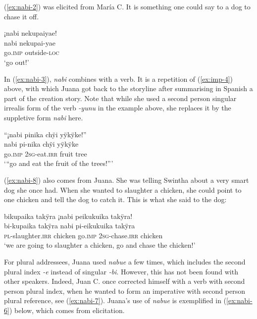 (\ref{ex:nabi-2}) was elicited from María C. It is something one could say to a dog to chase it off.

\largerpage
\ea\label{ex:nabi-2}
\begingl
\glpreamble ¡nabi nekupaiyae!\\
\gla nabi nekupai-yae\\
\glb go.\textsc{imp} outside-\textsc{loc}\\
\glft ‘go out!’
\endgl
\trailingcitation{[uxx-e120427l.078]}
\xe

In (\ref{ex:nabi-3}), \textit{nabi} combines with a verb. It is a repetition of (\ref{ex:imp-4}) above, with which Juana got back to the storyline after summarising in Spanish a part of the creation story. Note that while she used a second person singular irrealis form of the verb \textit{-yunu} in the example above, she replaces it by the suppletive form \textit{nabi} here.

\ea\label{ex:nabi-3}
\begingl
\glpreamble “¡nabi pinika chÿi yÿkÿke!”\\
\gla nabi pi-nika chÿi yÿkÿke\\
\glb go.\textsc{imp} 2\textsc{sg}-eat.\textsc{irr} fruit tree\\
\glft ‘“go and eat the fruit of the trees!”’
\endgl
\trailingcitation{[jxx-n101013s-1.885]}
\xe

(\ref{ex:nabi-8}) also comes from Juana. She was telling Swintha about a very smart dog she once had. When she wanted to slaughter a chicken, she could point to one chicken and tell the dog to catch it. This is what she said to the dog:

\ea\label{ex:nabi-8}
\begingl
\glpreamble bikupaika takÿra ¡nabi peikukuika takÿra!\\
\gla bi-kupaika takÿra nabi pi-eikukuika takÿra\\
\textsc{pl}-slaughter.\textsc{irr} chicken go.\textsc{imp} 2\textsc{sg}-chase.\textsc{irr} chicken\\
\glft ‘we are going to slaughter a chicken, go and chase the chicken!’
\endgl
\trailingcitation{[jxx-e191021e-2]}
\xe


For plural addressees, Juana used \textit{nabue} a few times, which includes the second plural index \textit{-e} instead of singular \textit{-bi}. However, this has not been found with other speakers. Indeed, Juan C. once corrected himself with a verb with second person plural index, when he wanted to form an imperative with second person plural reference, see (\ref{ex:nabi-7}). Juana’s use of \textit{nabue} is exemplified in (\ref{ex:nabi-6}) below, which comes from elicitation.

